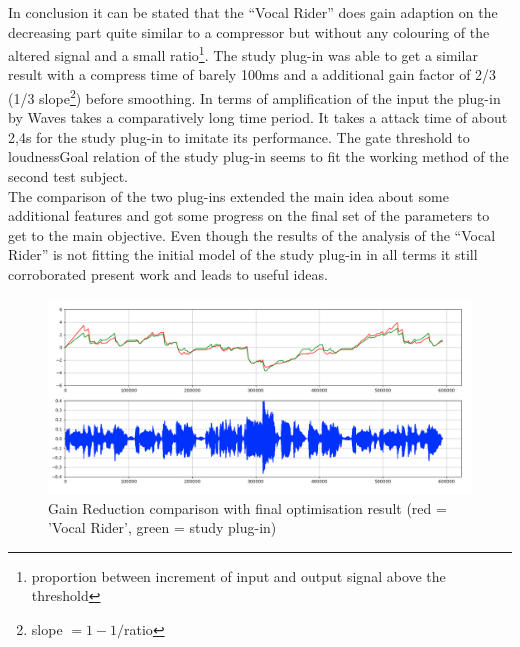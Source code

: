 In conclusion it can be stated that the “Vocal Rider” does gain adaption on the decreasing part quite similar to a compressor but without any colouring of the altered signal and a small ratio\footnote{proportion between increment of input and output signal above the threshold}. The study plug-in was able to get a similar result with a compress time of barely 100ms and a additional gain factor of 2/3 (1/3 slope\footnote{slope $= 1 - 1/$ratio}) before smoothing. In terms of amplification of the input the plug-in by Waves takes a comparatively long time period. It takes a attack time of about 2,4s for the study plug-in to imitate its performance. The gate threshold to loudnessGoal relation of the study plug-in seems to fit the working method of the second test subject.\\
The comparison of the two plug-ins extended the main idea about some additional features and got some progress on the final set of the parameters to get to the main objective. Even though the results of the analysis of the “Vocal Rider” is not fitting the initial model of the study plug-in in all terms it still corroborated present work and leads to useful ideas.\\

\begin{figure}[H]
\includegraphics[width=\textwidth]{images/compareResult}
\caption{Gain Reduction comparison with final optimisation result (red = 'Vocal Rider', green = study plug-in)}
\end{figure}